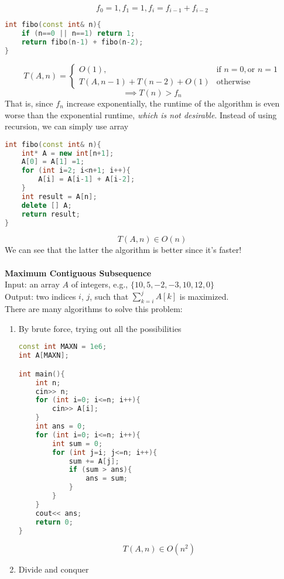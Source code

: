 \documentclass[11pt]{article}
\begin{document}
$$f_{0} =1, f_{1} = 1, f_{i} = f_{i-1} + f_{i-2}$$
\begin{lstlisting}[language=C++]
int fibo(const int& n){
	if (n==0 || n==1) return 1;
	return fibo(n-1) + fibo(n-2);
}
\end{lstlisting}
$$T(A, n) = \begin{cases} \mbox{$O(1), $}& \mbox{if } n = 0, \text{or } n =1 \\ \mbox{$T(A, n-1) + T(n-2) + O(1)$} & \mbox{otherwise} \end{cases}$$
$$\implies T(n) > f_{n}$$
That is, since $f_{n}$ increase exponentially, the runtime of the algorithm is even worse than the exponential runtime, \textit{which is not desirable}.
Instead of using recursion, we can simply use array
\begin{lstlisting}[language=C++]
int fibo(const int& n){
    int* A = new int[n+1];
    A[0] = A[1] =1;
    for (int i=2; i<n+1; i++){
        A[i] = A[i-1] + A[i-2];
    }
    int result = A[n];
    delete [] A;
    return result;
}
\end{lstlisting}
$$T(A, n) \in O(n)$$
We can see that the latter the algorithm is better since it's faster!\\\\
\textbf{Maximum Contiguous Subsequence}\\
Input: an array $A$ of integers, e.g., $\{10, 5, -2, -3, 10, 12, 0\}$\\
Output: two indices $i$, $j$, such that $\sum_{k=i}^{j}A[k]$ is maximized.\\
There are many algorithms to solve this problem:
\begin{enumerate}
\item By brute force, trying out all the possibilities
\begin{lstlisting}[language = C++]
const int MAXN = 1e6;
int A[MAXN];

int main(){
	int n;
	cin>> n;
	for (int i=0; i<=n; i++){
		cin>> A[i];	
	}
	int ans = 0;
	for (int i=0; i<=n; i++){
		int sum = 0;
		for (int j=i; j<=n; i++){
			sum += A[j];
			if (sum > ans){
				ans = sum;			
			}		
		}
	}
	cout<< ans;
	return 0;
}
\end{lstlisting}
$$T(A, n) \in O(n^{2})$$
\item Divide and conquer
\end{enumerate}
\end{document}
